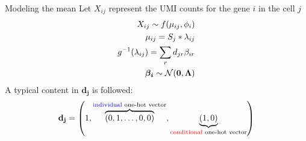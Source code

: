 \begin{frame}{Modeling the mean}
  Let \(X_{ij}\) represent the UMI counts for the gene \(i\) in the cell \(j\)
  \begin{align}
    X_{ij} \sim f(\mu_{ij}, \phi_i) \\
    \mu_{ij}  = S_j * \lambda_{ij} \\
    g^{-1}(\lambda_{ij})  = \sum_r d_{jr} \beta_{ir} \\
    \bm{\beta_i} \sim {\cal N}(\bm{0}, \bm{\Lambda})
  \end{align}
  A typical content in $\mathbf{d_j}$ is followed:
  \begin{equation*}
   \mathbf{d_j} = \left(1, \overbrace{(0, 1, \dots, 0, 0)}^{\text{\textcolor{blue}{individual} one-hot vector}}, \underbrace{(1, 0)}_{\text{\textcolor{red}{conditional} one-hot vector}}\right)
  \end{equation*}
\end{frame}
